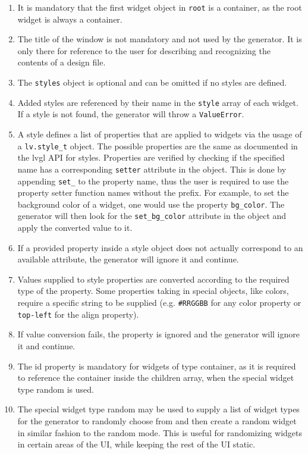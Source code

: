 \documentclass[Bachelor, BIC, english, fhCitStyle, IEEE]{BASE/twbook} %
\def\code#1{\texttt{#1}}
\begin{document}
\begin{enumerate}
    \item It is mandatory that the first widget object in \code{root} is a container, as the root widget is always a container.
    \item The title of the window is not mandatory and not used by the generator. It is only there for reference to the user for describing and recognizing the contents of a design file.
    \item The \code{styles} object is optional and can be omitted if no styles are defined.
    \item Added styles are referenced by their name in the \code{style} array of each widget. If a style is not found, the generator will throw a \code{ValueError}.
    \item A style defines a list of properties that are applied to widgets via the usage of a \code{lv.style\_t} object. The possible properties are the same as documented in the \ac{lvgl} API for styles.
Properties are verified by checking if the specified name has a corresponding \code{setter} attribute in the object. This is done by appending \code{set\_} to the property name, thus the user is required to use the property setter function names without the prefix. For example, to set the background color of a widget, one would use the property \code{bg\_color}. The generator will then look for the \code{set\_bg\_color} attribute in the object and apply the converted value to it.
    \item If a provided property inside a style object does not actually correspond to an available attribute, the generator will ignore it and continue.
    \item Values supplied to style properties are converted according to the required type of the property. Some properties taking in special objects, like colors, require a specific string to be supplied (e.g. \code{\#RRGGBB} for any color property or \code{top-left} for the align property).
    \item If value conversion fails, the property is ignored and the generator will ignore it and continue.
    \item The id property is mandatory for widgets of type container, as it is required to reference the container inside the children array, when the special widget type random is used.
    \item The special widget type random may be used to supply a list of widget types for the generator to randomly choose from and then create a random widget in similar fashion to the random mode. This is useful for randomizing widgets in certain areas of the UI, while keeping the rest of the UI static.
\end{enumerate}
\newpage
\end{document}
